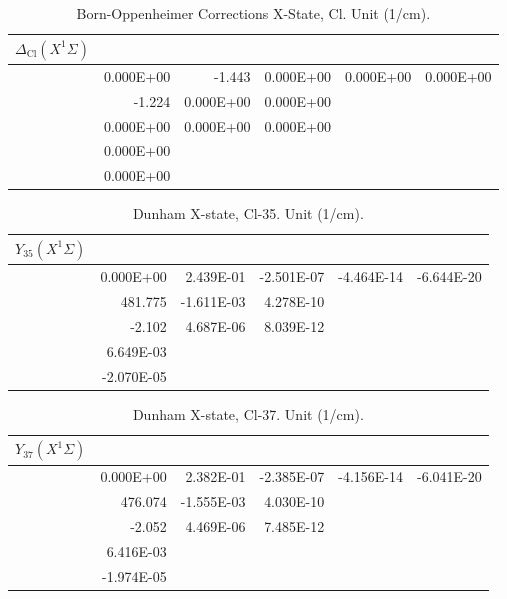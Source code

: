 \begin{table}
\begin{tabular}{crrrrr}
\toprule
$\Delta_\textrm{Cl} (X^1\Sigma)$\\ \midrule 
& 0.000E+00 & -1.443 & 0.000E+00 & 0.000E+00 & 0.000E+00 \\
& -1.224 & 0.000E+00 & 0.000E+00 \\
& 0.000E+00 & 0.000E+00 & 0.000E+00 \\
& 0.000E+00 \\
& 0.000E+00 \\
\bottomrule
\end{tabular}\caption{Born-Oppenheimer Corrections X-State, Cl. Unit (1/cm).}\end{table}
\begin{table}
\begin{tabular}{crrrrr}
\toprule
$Y_{35} (X^1\Sigma)$\\ \midrule 
& 0.000E+00 & 2.439E-01 & -2.501E-07 & -4.464E-14 & -6.644E-20 \\
& 481.775 & -1.611E-03 & 4.278E-10 \\
& -2.102 & 4.687E-06 & 8.039E-12 \\
& 6.649E-03 \\
& -2.070E-05 \\
\bottomrule
\end{tabular}\caption{Dunham X-state, Cl-35. Unit (1/cm).}\end{table}
\begin{table}
\begin{tabular}{crrrrr}
\toprule
$Y_{37} (X^1\Sigma)$\\ \midrule 
& 0.000E+00 & 2.382E-01 & -2.385E-07 & -4.156E-14 & -6.041E-20 \\
& 476.074 & -1.555E-03 & 4.030E-10 \\
& -2.052 & 4.469E-06 & 7.485E-12 \\
& 6.416E-03 \\
& -1.974E-05 \\
\bottomrule
\end{tabular}\caption{Dunham X-state, Cl-37. Unit (1/cm).}\end{table}
